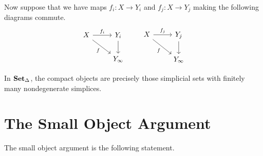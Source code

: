 \documentclass[main.tex]{subfiles}
\begin{document}
\begin{example}
  Now suppose that we have maps $f_{i}\colon X \to Y_{i}$ and $f_{j}\colon X \to Y_{j}$ making the following diagrams commute.
  \begin{equation*}
    \begin{tikzcd}
      X
      \arrow[r, "f_{i}"]
      \arrow[dr, swap, "f"]
      & Y_{i}
      \arrow[d]
      \\
      & Y_{\infty}
    \end{tikzcd}
    \qquad
    \begin{tikzcd}
      X
      \arrow[r, "f_{j}"]
      \arrow[dr, swap, "f"]
      & Y_{j}
      \arrow[d]
      \\
      & Y_{\infty}
    \end{tikzcd}
  \end{equation*}
\end{example}

\begin{example}
  \label{eg:compact_in_sset}
  In $\operatorname{\mathbf{Set}_{\Delta}}$, the compact objects are precisely those simplicial sets with finitely many nondegenerate simplices.
\end{example}

\section{The Small Object Argument}
\label{sec:the_small_object_argument}

The small object argument is the following statement.
\end{document}
